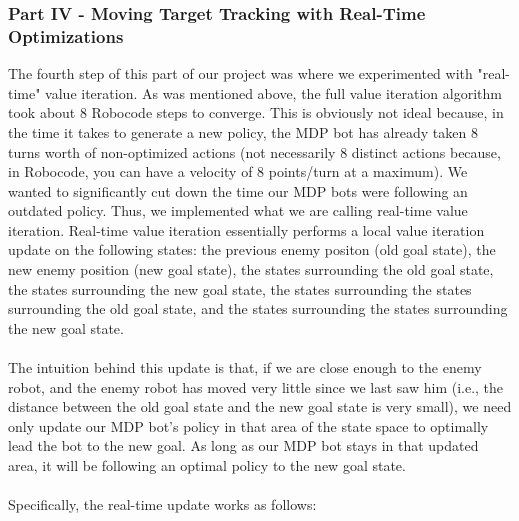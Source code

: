\documentclass{aiaa-tc}%
\begin{document}
\subsubsection{Part IV - Moving Target Tracking with Real-Time Optimizations}
The fourth step of this part of our project was where we experimented with "real-time" value iteration. As was mentioned above, the full value iteration algorithm took about 8 Robocode steps to converge. This is obviously not ideal because, in the time it takes to generate a new policy, the MDP bot has already taken 8 turns worth of non-optimized actions (not necessarily 8 distinct actions because, in Robocode, you can have a velocity of 8 points/turn at a maximum). We wanted to significantly cut down the time our MDP bots were following an outdated policy.  Thus, we implemented what we are calling real-time value iteration. Real-time value iteration essentially performs a local value iteration update on the following states: the previous enemy positon (old goal state), the new enemy position (new goal state), the states surrounding the old goal state, the states surrounding the new goal state, the states surrounding the states surrounding the old goal state, and the states surrounding the states surrounding the new goal state. \\ \\
The intuition behind this update is that, if we are close enough to the enemy robot, and the enemy robot has moved very little since we last saw him (i.e., the distance between the old goal state and the new goal state is very small), we need only update our MDP bot's policy in that area of the state space to optimally lead the bot to the new goal. As long as our MDP bot stays in that updated area, it will be following an optimal policy to the new goal state. \\ \\
Specifically, the real-time update works as follows:
\end{document}
